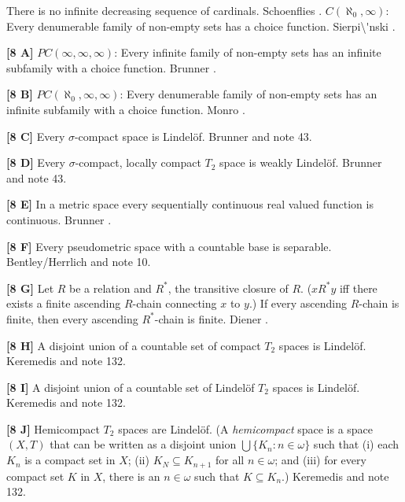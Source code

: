 \medskip
{} There is no infinite decreasing sequence of cardinals.
\ac{Schoenflies} \cite{1908}.
\medskip
{} $C(\aleph_{0},\infty)$:  Every denumerable family of
non-empty sets has a choice function.  \ac{Sierpi\'nski} \cite{1918}.
\smallskip
\item{}{\bf [8 A]}  $PC(\infty,\infty,\infty)$: Every infinite family of
non-empty sets has an infinite subfamily with a choice function.
\ac{Brunner} \cite{1983b}.
\smallskip
\item{}{\bf [8 B]}  $PC(\aleph_{0},\infty,\infty)$:  Every denumerable
family of non-empty sets has an infinite subfamily with a choice
function. \ac{Monro} \cite{1975}.
\smallskip
\item{}{\bf [8 C]} Every $\sigma$-compact space is Lindel\"of.
\ac{Brunner} \cite{1982b}  and note 43.
\smallskip
\item{}{\bf [8 D]}  Every $\sigma $-compact, locally compact $T_{2}$
space  is weakly Lindel\"of.  \ac{Brunner} \cite{1982b} and note 43.
\smallskip
\item{}{\bf [8 E]}  In a metric space every sequentially  continuous  real
valued function is continuous.  \ac{Brunner} \cite{1982c}.
\smallskip
\item{}{\bf [8 F]} Every pseudometric space with a countable base is
separable.  \ac{Bentley/Herrlich} \cite{1998} and note 10.
\smallskip
\item{}{\bf [8 G]}  Let $R$ be a relation and $R^*$, the transitive closure
of $R$. ($x\mathrel {R^*}y$ iff there exists a finite ascending $R$-chain
connecting $x$ to $y$.) If every ascending $R$-chain is finite, then every
ascending $R^*$-chain is finite. \ac{Diener} \cite{1994}.
\smallskip
\item{}{\bf [8 H]} A disjoint union of a countable set of compact
$T_2$ spaces is Lindel\"of. \ac{Keremedis} \cite{1998b} and note 132.
\smallskip
\item{}{\bf [8 I]} A disjoint union of a countable set of Lindel\"of
$T_2$ spaces is Lindel\"of. \ac{Keremedis} \cite{1998b} and note 132.
\smallskip
\item{}{\bf [8 J]} Hemicompact $T_2$ spaces are Lindel\"of.
(A {\it hemicompact} space is a space $(X,T)$ that can be written
as a disjoint union $\bigcup\{K_n: n\in\omega\}$ such that
(i) each $K_n$ is a compact set in $X$;
(ii) $K_N\subseteq K_{n+1}$ for all $n\in\omega$; and
(iii) for every compact set $K$ in $X$, there is an $n\in\omega$
such that $K\subseteq K_n$.) \ac{Keremedis} \cite{1998b} and note 132.
